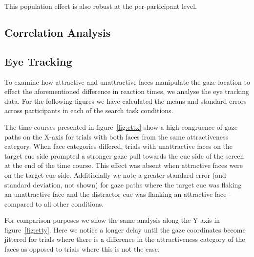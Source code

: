 		This population effect is also robust at the per-participant level.
    \subsection{Correlation Analysis}\label{sec:r_ca}
    \subsection{Eye Tracking}\label{sec:r_et}
		To examine how attractive and unattractive faces manipulate the gaze location to effect the aforementioned difference in reaction times, we analyse the eye tracking data.
		For the following figures we have calculated the means and standard errors across participants in each of the search task conditions.
		
		
		The time courses presented in figure~\ref{fig:ettx} show a high congruence of gaze paths on the X-axis for trials with both faces from the same attractiveness category.
		When face categories differed, trials with unattractive faces on the target cue side prompted a stronger gaze pull towards the cue side of the screen at the end of the time course.
		This effect was absent when attractive faces were on the target cue side.
		Additionally we note a greater standard error (and standard deviation, not shown) for gaze paths where the target cue was flaking an unattractive face and the distractor cue was flanking an attractive face
		- compared to all other conditions.
		
		For comparison purposes we show the same analysis along the Y-axis in figure~\ref{fig:etty}.
		Here we notice a longer delay until the gaze coordinates become jittered for trials where there is a difference in the attractiveness category of the faces as opposed to trials where this is not the case.
		
